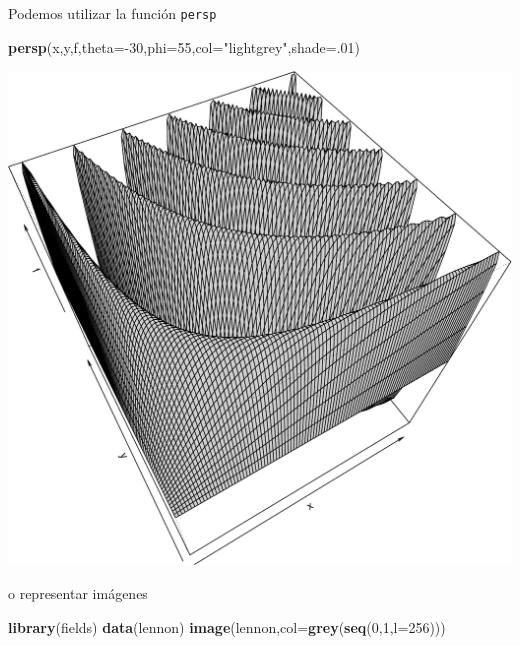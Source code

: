 \documentclass[]{article}
\newenvironment{Shaded}{\begin{snugshade}}{\end{snugshade}}
\newcommand{\KeywordTok}[1]{\textcolor[rgb]{0.13,0.29,0.53}{\textbf{{#1}}}}
\newcommand{\DataTypeTok}[1]{\textcolor[rgb]{0.13,0.29,0.53}{{#1}}}
\newcommand{\DecValTok}[1]{\textcolor[rgb]{0.00,0.00,0.81}{{#1}}}
\newcommand{\StringTok}[1]{\textcolor[rgb]{0.31,0.60,0.02}{{#1}}}
\newcommand{\NormalTok}[1]{{#1}}
\numberwithin{equation}{section}
\begin{document}
Podemos utilizar la función \texttt{persp}

\begin{Shaded}
\begin{Highlighting}[]
\KeywordTok{persp}\NormalTok{(x,y,f,}\DataTypeTok{theta=}\NormalTok{-}\DecValTok{30}\NormalTok{,}\DataTypeTok{phi=}\DecValTok{55}\NormalTok{,}\DataTypeTok{col=}\StringTok{"lightgrey"}\NormalTok{,}\DataTypeTok{shade=}\NormalTok{.}\DecValTok{01}\NormalTok{)}
\end{Highlighting}
\end{Shaded}

\begin{center}\includegraphics{tema1_files/figure-latex/unnamed-chunk-87-1} \end{center}

o representar imágenes

\begin{Shaded}
\begin{Highlighting}[]
\KeywordTok{library}\NormalTok{(fields)}
\KeywordTok{data}\NormalTok{(lennon)}
\KeywordTok{image}\NormalTok{(lennon,}\DataTypeTok{col=}\KeywordTok{grey}\NormalTok{(}\KeywordTok{seq}\NormalTok{(}\DecValTok{0}\NormalTok{,}\DecValTok{1}\NormalTok{,}\DataTypeTok{l=}\DecValTok{256}\NormalTok{)))}
\end{Highlighting}
\end{Shaded}
\end{document}
